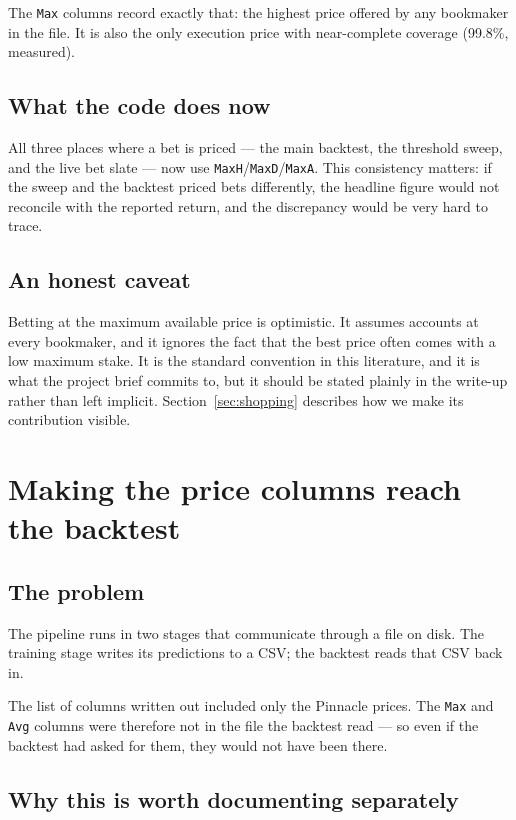 \documentclass[11pt,a4paper]{article}
\newcommand{\code}[1]{\texttt{#1}}
\begin{document}
The \code{Max} columns record exactly that: the highest price offered by any
bookmaker in the file. It is also the only execution price with near-complete
coverage (99.8\%, measured).

\subsection{What the code does now}

All three places where a bet is priced --- the main backtest, the threshold
sweep, and the live bet slate --- now use \code{MaxH}/\code{MaxD}/\code{MaxA}.
This consistency matters: if the sweep and the backtest priced bets
differently, the headline figure would not reconcile with the reported
return, and the discrepancy would be very hard to trace.

\subsection{An honest caveat}

Betting at the maximum available price is optimistic. It assumes accounts at
every bookmaker, and it ignores the fact that the best price often comes with
a low maximum stake. It is the standard convention in this literature, and it
is what the project brief commits to, but it should be stated plainly in the
write-up rather than left implicit. Section~\ref{sec:shopping} describes how
we make its contribution visible.

\section{Making the price columns reach the backtest}

\subsection{The problem}

The pipeline runs in two stages that communicate through a file on disk. The
training stage writes its predictions to a CSV; the backtest reads that CSV
back in.

The list of columns written out included only the Pinnacle prices. The
\code{Max} and \code{Avg} columns were therefore not in the file the backtest
read --- so even if the backtest had asked for them, they would not have been
there.

\subsection{Why this is worth documenting separately}
\end{document}
